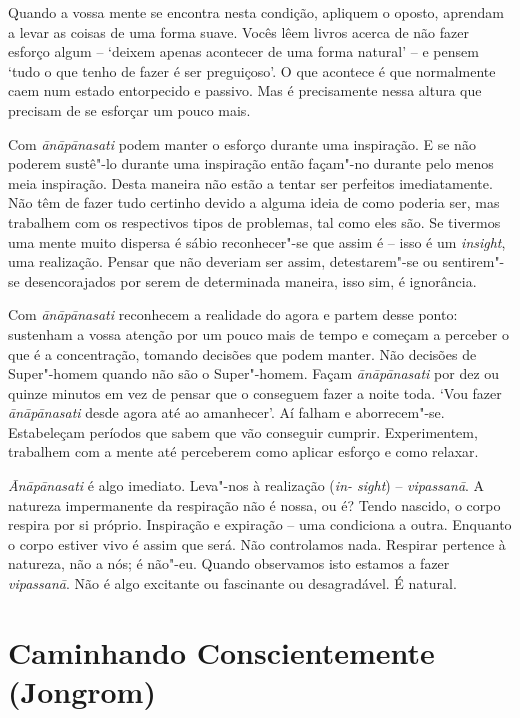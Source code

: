 Quando a vossa mente se encontra nesta condição, apliquem o oposto,
aprendam a levar as coisas de uma forma suave. Vocês lêem livros acerca
de não fazer esforço algum -- `deixem apenas
acontecer de uma forma natural' -- e pensem `tudo o que tenho de
fazer é ser preguiçoso'. O que acontece é que normalmente caem num
estado entorpecido e passivo. Mas é precisamente nessa altura que
precisam de se esforçar um pouco mais.

Com \emph{ānāpānasati} podem manter o esforço durante uma inspiração. E
se não poderem sustê"-lo durante uma inspiração então façam"-no durante
pelo menos meia inspiração. Desta maneira não estão a tentar ser
perfeitos imediatamente. Não têm de fazer tudo certinho devido a alguma
ideia de como poderia ser, mas trabalhem com os respectivos tipos de
problemas, tal como eles são. Se tivermos uma mente muito dispersa é
sábio reconhecer"-se que assim é -- isso é um \emph{insight}, uma
realização. Pensar que não deveriam ser assim, detestarem"-se ou
sentirem"-se desencorajados por serem de determinada maneira, isso sim, é
ignorância.

Com \emph{ānāpānasati} reconhecem a realidade do agora e partem desse
ponto: sustenham a vossa atenção por um pouco mais de tempo e começam a
perceber o que é a concentração, tomando decisões que podem manter. Não
decisões de Super"-homem quando não são o Super"-homem. Façam
\emph{ānāpānasati} por dez ou quinze minutos em vez de pensar que o
conseguem fazer a noite toda. `Vou fazer \emph{ānāpānasati} desde agora
até ao amanhecer'. Aí falham e aborrecem"-se. Estabeleçam períodos que
sabem que vão conseguir cumprir. Experimentem, trabalhem com a mente até
perceberem como aplicar esforço e como relaxar.

\emph{Ānāpānasati} é algo imediato. Leva"-nos à realização (\emph{in-
sight}) -- \emph{vipassanā}. A natureza impermanente da respiração não é
nossa, ou é? Tendo nascido, o corpo respira por si próprio. Inspiração e
expiração -- uma condiciona a outra. Enquanto o corpo estiver vivo é
assim que será. Não controlamos nada. Respirar pertence à natureza, não
a nós; é não"-eu. Quando observamos isto estamos a fazer
\emph{vipassanā}. Não é algo excitante ou fascinante ou desagradável. É
natural.

\chapter{Caminhando Conscientemente (Jongrom)}

